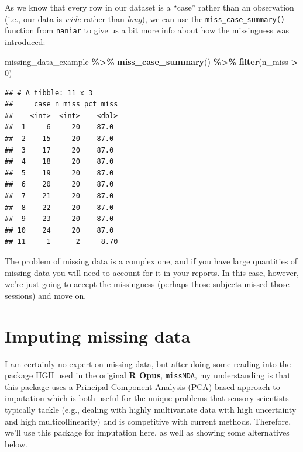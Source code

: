 \documentclass[
]{book}
\newenvironment{Shaded}{\begin{snugshade}}{\end{snugshade}}
\newcommand{\DecValTok}[1]{\textcolor[rgb]{0.00,0.00,0.81}{#1}}
\newcommand{\FunctionTok}[1]{\textcolor[rgb]{0.13,0.29,0.53}{\textbf{#1}}}
\newcommand{\NormalTok}[1]{#1}
\newcommand{\SpecialCharTok}[1]{\textcolor[rgb]{0.81,0.36,0.00}{\textbf{#1}}}
\begin{document}
As we know that every row in our dataset is a ``case'' rather than an observation (i.e., our data is \emph{wide} rather than \emph{long}), we can use the \texttt{miss\_case\_summary()} function from \texttt{naniar} to give us a bit more info about how the missingness was introduced:

\begin{Shaded}
\begin{Highlighting}[]
\NormalTok{missing\_data\_example }\SpecialCharTok{\%\textgreater{}\%}
  \FunctionTok{miss\_case\_summary}\NormalTok{() }\SpecialCharTok{\%\textgreater{}\%}
  \FunctionTok{filter}\NormalTok{(n\_miss }\SpecialCharTok{\textgreater{}} \DecValTok{0}\NormalTok{)}
\end{Highlighting}
\end{Shaded}

\begin{verbatim}
## # A tibble: 11 x 3
##     case n_miss pct_miss
##    <int>  <int>    <dbl>
##  1     6     20    87.0 
##  2    15     20    87.0 
##  3    17     20    87.0 
##  4    18     20    87.0 
##  5    19     20    87.0 
##  6    20     20    87.0 
##  7    21     20    87.0 
##  8    22     20    87.0 
##  9    23     20    87.0 
## 10    24     20    87.0 
## 11     1      2     8.70
\end{verbatim}

The problem of missing data is a complex one, and if you have large quantities of missing data you will need to account for it in your reports. In this case, however, we're just going to accept the missingness (perhaps those subjects missed those sessions) and move on.

\section{Imputing missing data}\label{imputing-missing-data}

I am certainly no expert on missing data, but \href{https://www.jstatsoft.org/article/view/v070i01}{after doing some reading into the package HGH used in the original \textbf{R Opus}, \texttt{missMDA}}, my understanding is that this package uses a Principal Component Analysis (PCA)-based approach to imputation which is both useful for the unique problems that sensory scientists typically tackle (e.g., dealing with highly multivariate data with high uncertainty and high multicollinearity) and is competitive with current methods. Therefore, we'll use this package for imputation here, as well as showing some alternatives below.
\end{document}
